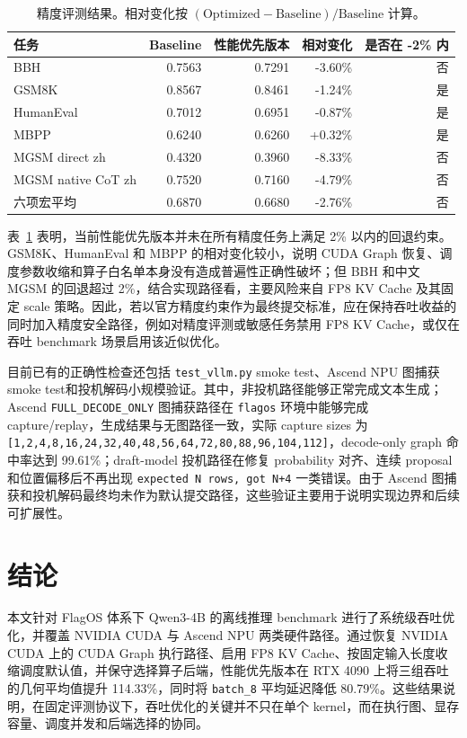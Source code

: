 \documentclass[UTF8,10.5pt]{ctexart}
\newcommand{\code}[1]{\texttt{#1}}
\begin{document}
\begin{table}[H]
\centering
\caption{精度评测结果。相对变化按 $(\mathrm{Optimized}-\mathrm{Baseline})/\mathrm{Baseline}$ 计算。}
\label{tab:accuracy-results}
\begin{tabular}{lrrrr}
\toprule
任务 & Baseline & 性能优先版本 & 相对变化 & 是否在 -2\% 内 \\
\midrule
BBH & 0.7563 & 0.7291 & -3.60\% & 否 \\
GSM8K & 0.8567 & 0.8461 & -1.24\% & 是 \\
HumanEval & 0.7012 & 0.6951 & -0.87\% & 是 \\
MBPP & 0.6240 & 0.6260 & +0.32\% & 是 \\
MGSM direct zh & 0.4320 & 0.3960 & -8.33\% & 否 \\
MGSM native CoT zh & 0.7520 & 0.7160 & -4.79\% & 否 \\
六项宏平均 & 0.6870 & 0.6680 & -2.76\% & 否 \\
\bottomrule
\end{tabular}
\end{table}

表~\ref{tab:accuracy-results} 表明，当前性能优先版本并未在所有精度任务上满足 2\% 以内的回退约束。GSM8K、HumanEval 和 MBPP 的相对变化较小，说明 CUDA Graph 恢复、调度参数收缩和算子白名单本身没有造成普遍性正确性破坏；但 BBH 和中文 MGSM 的回退超过 2\%，结合实现路径看，主要风险来自 FP8 KV Cache 及其固定 scale 策略。因此，若以官方精度约束作为最终提交标准，应在保持吞吐收益的同时加入精度安全路径，例如对精度评测或敏感任务禁用 FP8 KV Cache，或仅在吞吐 benchmark 场景启用该近似优化。

目前已有的正确性检查还包括 \code{test\_vllm.py} smoke test、Ascend NPU 图捕获smoke test和投机解码小规模验证。其中，非投机路径能够正常完成文本生成；Ascend \code{FULL\_DECODE\_ONLY} 图捕获路径在 \code{flagos} 环境中能够完成 capture/replay，生成结果与无图路径一致，实际 capture sizes 为 \code{[1,2,4,8,16,24,32,40,48,56,64,72,80,88,96,104,112]}，decode-only graph 命中率达到 99.61\%；draft-model 投机路径在修复 probability 对齐、连续 proposal 和位置偏移后不再出现 \code{expected N rows, got N+4} 一类错误。由于 Ascend 图捕获和投机解码最终均未作为默认提交路径，这些验证主要用于说明实现边界和后续可扩展性。

\section{结论}

本文针对 FlagOS 体系下 Qwen3-4B 的离线推理 benchmark 进行了系统级吞吐优化，并覆盖 NVIDIA CUDA 与 Ascend NPU 两类硬件路径。通过恢复 NVIDIA CUDA 上的 CUDA Graph 执行路径、启用 FP8 KV Cache、按固定输入长度收缩调度默认值，并保守选择算子后端，性能优先版本在 RTX 4090 上将三组吞吐的几何平均值提升 114.33\%，同时将 \code{batch\_8} 平均延迟降低 80.79\%。这些结果说明，在固定评测协议下，吞吐优化的关键并不只在单个 kernel，而在执行图、显存容量、调度并发和后端选择的协同。
\end{document}
